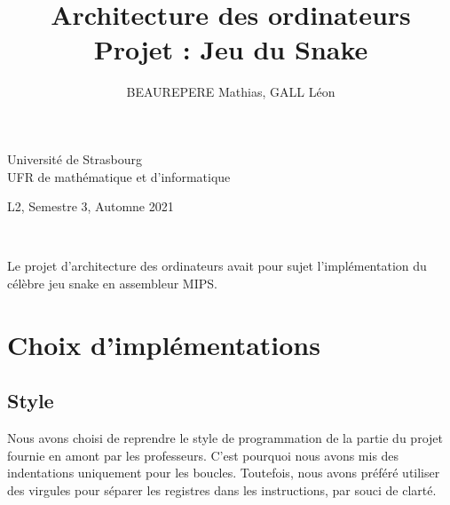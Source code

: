 \documentclass[a4paper]{article}
\title{Architecture des ordinateurs\\\large Projet : Jeu du Snake}
\author{BEAUREPERE Mathias, GALL Léon}
\date{}
\begin{document}
\hspace{-0.5cm}\begin{minipage}{0.5\textwidth}
Université de Strasbourg\\
UFR de mathématique et d'informatique
\end{minipage}
\hspace*{\fill}\begin{minipage}{0.5\textwidth}
\hspace*{\fill}L2, Semestre 3, Automne 2021\\
\hspace*{\fill}\@author
\end{minipage}
\\
\begin{center}
  \huge \@title
\end{center}
\vspace*{1cm}


Le projet d'architecture des ordinateurs avait pour sujet l'implémentation du célèbre jeu snake en assembleur MIPS.

\section{Choix d'implémentations}

\subsection{Style}
Nous avons choisi  de reprendre le style de programmation de la partie du projet fournie en amont par les professeurs.
C'est pourquoi nous avons mis des indentations uniquement pour les boucles. Toutefois, nous avons préféré utiliser des virgules
pour séparer les registres dans les instructions, par souci de clarté.
\end{document}
